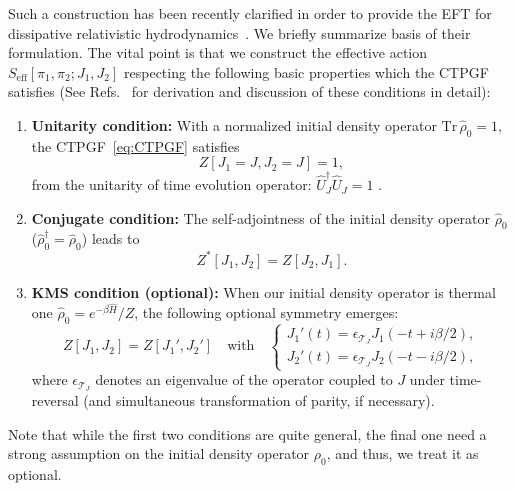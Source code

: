 \documentclass[a4paper,11pt]{article}
\newcommand{\with}{{\quad\mathrm{with}}\quad}
\begin{document}
\medskip
Such a construction has been recently clarified in order to provide
the EFT for dissipative relativistic hydrodynamics~\cite{Crossley:2015evo,Glorioso:2017fpd}.
We briefly summarize basis of their formulation. 
The vital point is that we construct the effective action 
$S_{\mathrm{eff}} [\pi_1,\pi_2;J_1,J_2]$ respecting 
the following basic properties which the CTPGF satisfies 
(See Refs.~\cite{Crossley:2015evo,Glorioso:2017fpd} 
for derivation and discussion of these conditions in detail): 
\begin{enumerate}
 \item \textbf{Unitarity condition:}
       With a normalized initial density operator 
       $\mathrm{Tr}\,\hat{\rho}_0 = 1$,
       the CTPGF~\eqref{eq:CTPGF} satisfies 
       \begin{equation}
	Z[J_1 = J ,J_2 = J] = 1 ,
       \end{equation}
       from the unitarity of time evolution operator: 
       $\hat{U}_{J}^\dagger\hat{U}_{J}=1$ .
 \item \textbf{Conjugate condition:}
       The self-adjointness of the initial density operator $\hat{\rho}_{0}$ 
       ($\hat{\rho}_0^\dag = \hat{\rho}_0$) leads to 
       \begin{equation}
	Z^* [J_1, J_2] = Z[J_2, J_1] .
       \end{equation}
 \item \textbf{KMS condition (optional):}       
       When our initial density operator is thermal one 
       $\hat{\rho}_0 = e^{-\beta \hat{H}}/Z$, the following optional symmetry 
       emerges: 
       \begin{equation}
       \label{eq_KMS}
	Z [J_1,J_2 ] =  Z [J_1', J_2'] \with 
	 \begin{cases}
	  J_1'(t) = \epsilon_{\mathcal{T}_J} J_1 (-t + i \beta /2) , \\
	  J_2'(t) = \epsilon_{\mathcal{T}_J} J_2 (-t - i\beta/2) ,
	 \end{cases}
       \end{equation}
       where $\epsilon_{\mathcal{T}_J}$ denotes an eigenvalue of 
       the operator coupled to $J$ under 
       time-reversal (and simultaneous transformation of parity, if necessary).
\end{enumerate}
Note that while the first two conditions are quite general, 
the final one need a strong assumption on the initial density operator 
$\rho_0$, and thus, we treat it as optional.
\end{document}
